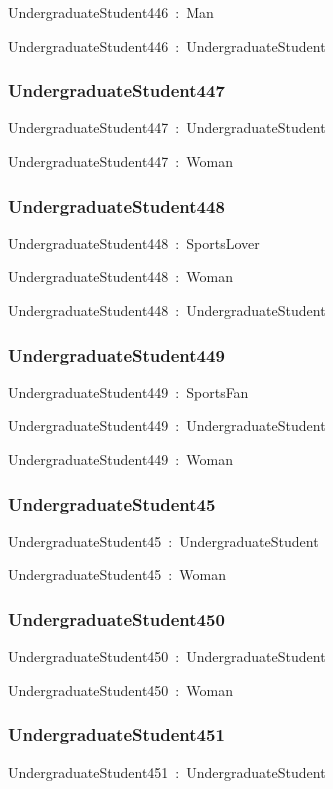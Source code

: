 \documentclass{article}
\begin{document}
UndergraduateStudent446~:~Man

UndergraduateStudent446~:~UndergraduateStudent

\subsubsection*{UndergraduateStudent447}

UndergraduateStudent447~:~UndergraduateStudent

UndergraduateStudent447~:~Woman

\subsubsection*{UndergraduateStudent448}

UndergraduateStudent448~:~SportsLover

UndergraduateStudent448~:~Woman

UndergraduateStudent448~:~UndergraduateStudent

\subsubsection*{UndergraduateStudent449}

UndergraduateStudent449~:~SportsFan

UndergraduateStudent449~:~UndergraduateStudent

UndergraduateStudent449~:~Woman

\subsubsection*{UndergraduateStudent45}

UndergraduateStudent45~:~UndergraduateStudent

UndergraduateStudent45~:~Woman

\subsubsection*{UndergraduateStudent450}

UndergraduateStudent450~:~UndergraduateStudent

UndergraduateStudent450~:~Woman

\subsubsection*{UndergraduateStudent451}

UndergraduateStudent451~:~UndergraduateStudent
\end{document}
